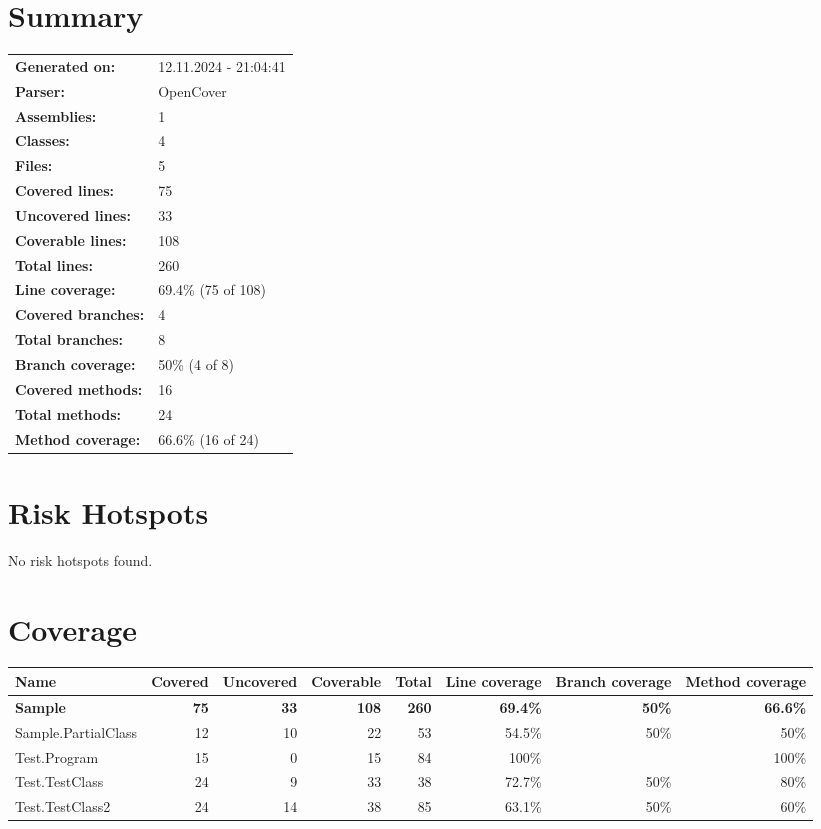 \documentclass[a4paper,landscape,10pt]{article}
\begin{document}
\setcounter{secnumdepth}{-1}
\section{Summary}
\begin{longtable}[l]{ll}
\textbf{Generated on:} & 12.11.2024 - 21:04:41\\
\textbf{Parser:} & OpenCover\\
\textbf{Assemblies:} & 1\\
\textbf{Classes:} & 4\\
\textbf{Files:} & 5\\
\textbf{Covered lines:} & 75\\
\textbf{Uncovered lines:} & 33\\
\textbf{Coverable lines:} & 108\\
\textbf{Total lines:} & 260\\
\textbf{Line coverage:} & 69.4\% (75 of 108)\\
\textbf{Covered branches:} & 4\\
\textbf{Total branches:} & 8\\
\textbf{Branch coverage:} & 50\% (4 of 8)\\
\textbf{Covered methods:} & 16\\
\textbf{Total methods:} & 24\\
\textbf{Method coverage:} & 66.6\% (16 of 24)\\
\end{longtable}
\section{Risk Hotspots}
No risk hotspots found.
\section{Coverage}
\begin{longtable}[l]{|l|r|r|r|r|r|r|r|}
\hline
\textbf{Name} & \textbf{Covered} & \textbf{Uncovered} & \textbf{Coverable} & \textbf{Total} & \textbf{Line coverage} & \textbf{Branch coverage} & \textbf{Method coverage}\\
\hline
\textbf{Sample} & \textbf{75} & \textbf{33} & \textbf{108} & \textbf{260} & \textbf{69.4\%} & \textbf{50\%} & \textbf{66.6\%}\\
\hline
Sample.PartialClass & 12 & 10 & 22 & 53 & 54.5\% & 50\% & 50\%\\
\hline
Test.Program & 15 & 0 & 15 & 84 & 100\% &  & 100\%\\
\hline
Test.TestClass & 24 & 9 & 33 & 38 & 72.7\% & 50\% & 80\%\\
\hline
Test.TestClass2 & 24 & 14 & 38 & 85 & 63.1\% & 50\% & 60\%\\
\hline
\end{longtable}
\newpage
\end{document}
